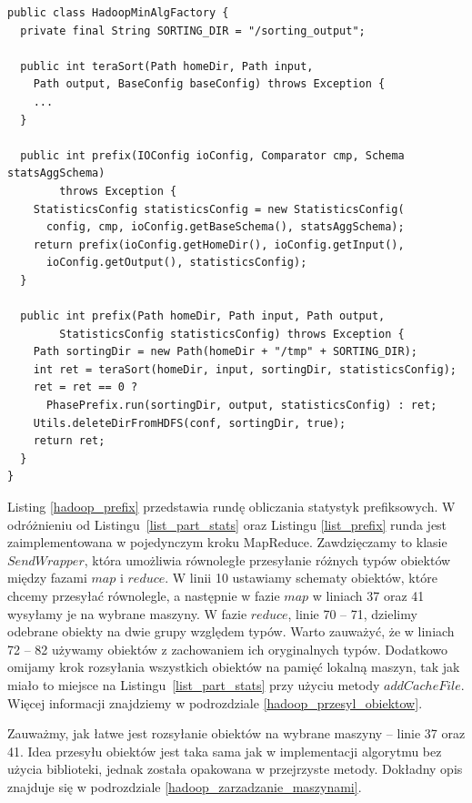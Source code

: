 \documentclass[magisterska]{pracamgr}
\begin{document}
\begin{lstlisting}[language=SmallJava,firstnumber=1,label=hadoop_run_2,caption=Uruchamianie algorytmu - część 2]
public class HadoopMinAlgFactory {
  private final String SORTING_DIR = "/sorting_output";
  
  public int teraSort(Path homeDir, Path input,
    Path output, BaseConfig baseConfig) throws Exception {
    ...
  }
  
  public int prefix(IOConfig ioConfig, Comparator cmp, Schema statsAggSchema)
        throws Exception {
    StatisticsConfig statisticsConfig = new StatisticsConfig(
      config, cmp, ioConfig.getBaseSchema(), statsAggSchema);
    return prefix(ioConfig.getHomeDir(), ioConfig.getInput(),
      ioConfig.getOutput(), statisticsConfig);
  }

  public int prefix(Path homeDir, Path input, Path output,
        StatisticsConfig statisticsConfig) throws Exception {
    Path sortingDir = new Path(homeDir + "/tmp" + SORTING_DIR);
    int ret = teraSort(homeDir, input, sortingDir, statisticsConfig);
    ret = ret == 0 ?
      PhasePrefix.run(sortingDir, output, statisticsConfig) : ret;
    Utils.deleteDirFromHDFS(conf, sortingDir, true);
    return ret;
  }
}
\end{lstlisting}

Listing \ref{hadoop_prefix} przedstawia rundę obliczania statystyk prefiksowych. W odróżnieniu od \mbox{Listingu \ref{list_part_stats}} oraz Listingu \ref{list_prefix} runda jest zaimplementowana w pojedynczym kroku MapReduce. Zawdzięczamy to klasie \(SendWrapper\), która umożliwia równoległe przesyłanie różnych typów obiektów między fazami \(map\) i \(reduce\). W linii 10 ustawiamy schematy obiektów, które chcemy przesyłać równolegle, a następnie w fazie \(map\) w liniach 37 oraz 41 wysyłamy je na wybrane maszyny. W fazie \(reduce\), linie 70 -- 71, dzielimy odebrane obiekty na dwie grupy względem typów. Warto zauważyć, że w liniach 72 -- 82 używamy obiektów z zachowaniem ich oryginalnych typów. Dodatkowo omijamy krok rozsyłania wszystkich obiektów na pamięć lokalną maszyn, tak jak miało to miejsce na \mbox{Listingu \ref{list_part_stats}} przy użyciu metody \(addCacheFile\). Więcej informacji znajdziemy w podrozdziale \ref{hadoop_przesyl_obiektow}.

Zauważmy, jak łatwe jest rozsyłanie obiektów na wybrane maszyny -- linie 37 oraz 41. Idea przesyłu obiektów jest taka sama jak w implementacji algorytmu bez użycia biblioteki, jednak została opakowana w przejrzyste metody. Dokładny opis znajduje się w podrozdziale \ref{hadoop_zarzadzanie_maszynami}.
\end{document}

